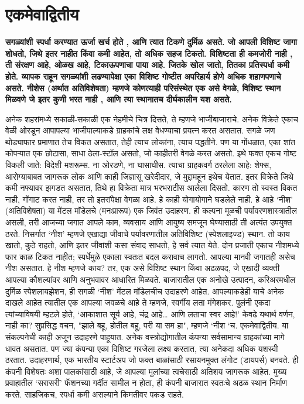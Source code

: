 \chapter{एकमेवाद्वितीय }

\textcolor{blue!60!black}{\textbf{सगळ्यांशी स्पर्धा करण्यात ऊर्जा खर्च होते , आणि त्यात टिकणे दुर्मिळ असते. जो आपली विशिष्ट जागा शोधतो, जिथे इतर नाहीत किंवा कमी आहेत, तो अधिक सहज टिकतो. विशिष्टता ही कमजोरी नाही , ती संरक्षण आहे, ओळख आहे, टिकाऊपणाचा पाया आहे. जितके खोल जातो, तितका प्रतिस्पर्धा कमी होते. व्यापक राहून सगळ्यांशी लढण्यापेक्षा एका विशिष्ट गोष्टीत अपरिहार्य होणे अधिक शहाणपणाचे असते. नीशेस  (अर्थात अतिविशेषता) म्हणजे कोणत्याही परिसंस्थेत एक असे वेगळे, विशिष्ट स्थान मिळवणे जे इतर कुणी भरत नाही , आणि त्या स्थानातच दीर्घकालीन यश असते.}}

अनेक शहरांमध्ये सकाळी-सकाळी एक नेहमीचे चित्र दिसते, ते म्हणजे भाजीबाजाराचे. अनेक विक्रेते एकाच वेळी ओरडून आपापल्या भाजीपाल्याकडे ग्राहकांचे लक्ष वेधण्याचा प्रयत्न करत असतात. सगळे जण थोड्याफार प्रमाणात तेच विकत असतात, तेही त्याच लोकांना, त्याच पद्धतीने. पण या गोंधळात, एका शांत कोपऱ्यात एक छोटासा, साधा ठेला-स्टॉल असतो, जो काहीतरी वेगळे करत असतो. इथे फक्त एकच गोष्ट विकली जाते: विदेशी मशरूम्स. ना ओरडणे, ना घासाघीस. त्याचा ग्राहकवर्ग ठरलेला आहे: शेफ्स, आरोग्याबाबत जागरूक लोक आणि काही जिज्ञासू खरेदीदार, जे मुद्दामहून इथेच येतात. इतर विक्रेते जिथे कमी नफ्यावर झगडत असतात, तिथे हा विक्रेता मात्र भरभराटीस आलेला दिसतो. कारण तो स्वस्त विकत नाही, गोंगाट करत नाही, तर तो इतरांपेक्षा वेगळा आहे.
हे काही योगायोगाने घडलेले नाही. हे आहे ‘नीश’ (अतिविशेषता) या मेंटल मॉडेलचे (मनःप्रारूप) एक जिवंत उदाहरण. ही कल्पना मूळची पर्यावरणशास्त्रातील असली, तरी आजच्या जगात आपले काम, व्यवसाय आणि आयुष्य समजून घेण्यासाठी ती अत्यंत उपयुक्त ठरते.
निसर्गात ‘नीश’ म्हणजे एखाद्या जीवाचे पर्यावरणातील अतिविशिष्ट (स्पेशलाइज्ड) स्थान. तो काय खातो, कुठे राहतो, आणि इतर जीवांशी कसा संवाद साधतो, हे सर्व त्यात येते. दोन प्रजाती एकाच नीशमध्ये फार काळ टिकत नाहीत; स्पर्धेमुळे एकाला स्वतःत बदल करावाच लागतो. आपल्या मानवी जगातही असेच नीश असतात. हे नीश म्हणजे काय? तर, एक असे विशिष्ट स्थान किंवा अढळपद, जे एखादी व्यक्ती आपल्या कौशल्यांवर आणि अनुभवावर आधारित मिळवते. बाजारातील एक अनोखे उत्पादन, करिअरमधील दुर्मिळ स्पेशलायझेशन, ही सगळी ‘नीश’ मेंटल मॉडेलचीच उदाहरणे आहेत. आपल्याकडेही याचे अनेक दाखले आहेत त्यातील एक आपल्या जवळचे आहे ते म्हणजे, स्वर्गीय लता मंगेशकर. पुलंनी एकदा त्यांच्याविषयी म्हटले होते, ‘आकाशात सूर्य आहे, चंद्र आहे… आणि लताचा स्वर आहे!’ केवढे यथार्थ वर्णन, नाही का? सुप्रसिद्ध वचन, "झाले बहू, होतील बहू, परी या सम हा", म्हणजे ‘नीश ‘च. एकमेवाद्वितीय. या संकल्पनेची काही अजून उदाहरणे पाहूयात. 
अनेक वस्त्रोद्योगातील कंपन्या सर्वसामान्य ग्राहकांच्या मागे धावत असतात. पण ज्या कंपन्या एका विशिष्ट गरजेला लक्ष्य करतात, त्या अनेकदा अधिक यशस्वी ठरतात. उदाहरणार्थ, एक भारतीय स्टार्टअप जो फक्त बाळांसाठी रसायनमुक्त लंगोट (डायपर्स) बनवते. ही कंपनी विशेषतः अशा पालकांसाठी आहे, जे आपल्या मुलांच्या त्वचेसाठी अतिशय जागरूक आहेत. मुख्य प्रवाहातील ‘सरासरी’ फॅशनच्या गर्दीत सामील न होता, ही कंपनी बाजारात स्वतःचे अढळ स्थान निर्माण करते. साहजिकच, स्पर्धा कमी असल्याने किमतीवर पकड राहते.
